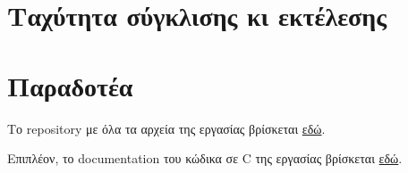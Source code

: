 \documentclass[11pt, twocolumn]{article}
\begin{document}
\section*{Tαχύτητα σύγκλισης κι εκτέλεσης}


\section*{Παραδοτέα}
Το repository με όλα τα αρχεία της εργασίας βρίσκεται
\href{https://github.com/nicktheway/Pagerank}{εδώ}.

Επιπλέον, το documentation του κώδικα σε C της εργασίας βρίσκεται
\href{https://nicktheway.github.io/Pagerank/html/index.html}{εδώ}.

\printbibliography

 
\end{document}
